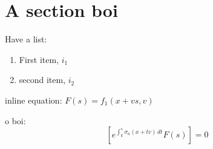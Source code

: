 \documentclass{article}
\begin{document}
\section{A section boi} %
\label{sec:A section boi}

Have a list:

\begin{enumerate}
  \item First item, $i_1$
  \item second item, $i_2$
\end{enumerate}

inline equation: \(F(s) = f_1(x + vs, v)\)

o boi:
\begin{equation}
  
  \label{eq:anequationboi}
  \left[ e^{\int_k^s \sigma_a(x + tv)\,dt} F(s) \right] = 0
\end{equation}

\end{document}
